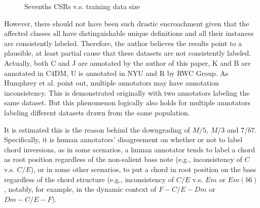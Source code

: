 \begin{figure}
\centering
{}
\caption{Sevenths CSRs v.s. training data size}
\label{fig:3-csr-trainingdata-S}
\end{figure}

However, there should not have been such drastic encroachment given that the affected classes all have distinguishable unique definitions and all their instances are consistently labeled. Therefore, the author believes the results point to a plausible, at least partial cause that these datasets are not consistently labeled. Actually, both C and J are annotated by the author of this paper, K and B are annotated in C4DM, U is annotated in NYU and R by RWC Group. As Humphrey et al. \cite{humphreyfour} point out, multiple annotators may have annotation inconsistency. This is demonstrated originally with two annotators labeling the same dataset. But this phenomenon logically also holds for multiple annotators labeling different datasets drawn from the same population.

It is estimated this is the reason behind the downgrading of $M/5$, $M/3$ and $7/b7$. Specifically, it is human annotators' disagreement on whether or not to label chord inversions, as in some scenarios, a human annotator tends to label a chord as root position regardless of the non-salient bass note (e.g., inconsistency of $C$ v.s. $C/E$), or in some other scenarios, to put a chord in root position on the bass regardless of the chord structure (e.g., inconsistency of $C/E$ v.s. $Em$ or $Em(b6)$, notably, for example, in the dynamic context of $F-C/E-Dm$ or $Dm-C/E-F$).

